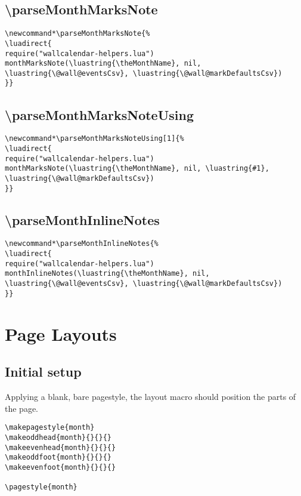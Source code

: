 \documentclass[11pt,oneside]{memoir-article}
\begin{document}
\section{\textbackslash parseMonthMarksNote}
\label{sec:org210d0ef}

\begin{verbatim}
\newcommand*\parseMonthMarksNote{%
\luadirect{
require("wallcalendar-helpers.lua")
monthMarksNote(\luastring{\theMonthName}, nil, \luastring{\@wall@eventsCsv}, \luastring{\@wall@markDefaultsCsv})
}}
\end{verbatim}

\section{\textbackslash parseMonthMarksNoteUsing}
\label{sec:org580bac4}

\begin{verbatim}
\newcommand*\parseMonthMarksNoteUsing[1]{%
\luadirect{
require("wallcalendar-helpers.lua")
monthMarksNote(\luastring{\theMonthName}, nil, \luastring{#1}, \luastring{\@wall@markDefaultsCsv})
}}
\end{verbatim}

\section{\textbackslash parseMonthInlineNotes}
\label{sec:org75bcbbe}

\begin{verbatim}
\newcommand*\parseMonthInlineNotes{%
\luadirect{
require("wallcalendar-helpers.lua")
monthInlineNotes(\luastring{\theMonthName}, nil, \luastring{\@wall@eventsCsv}, \luastring{\@wall@markDefaultsCsv})
}}
\end{verbatim}

\chapter{Page Layouts}
\label{sec:orga19b720}
\section{Initial setup}
\label{sec:orga88ba1c}

Applying a blank, bare pagestyle, the layout macro should position the parts of
the page.

\begin{verbatim}
\makepagestyle{month}
\makeoddhead{month}{}{}{}
\makeevenhead{month}{}{}{}
\makeoddfoot{month}{}{}{}
\makeevenfoot{month}{}{}{}

\pagestyle{month}
\end{verbatim}
\end{document}
